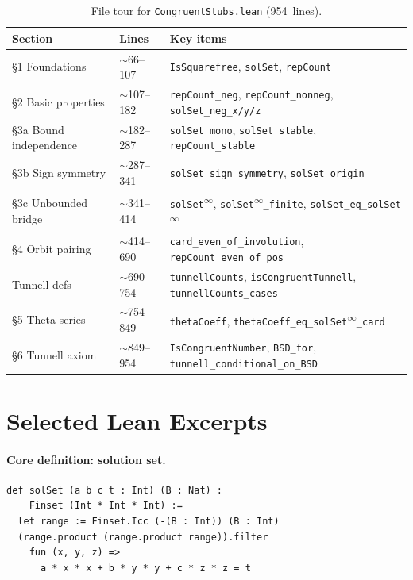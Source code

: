 \documentclass[11pt,a4paper]{article}
\theoremstyle{definition}
\newcommand{\lean}[1]{\texttt{#1}}
\begin{document}
\begin{table}[ht]
\centering
\small
\begin{tabular}{@{}llp{6cm}@{}}
\toprule
\textbf{Section} & \textbf{Lines} & \textbf{Key items} \\
\midrule
\S1 Foundations
  & $\sim$66--107
  & \lean{IsSquarefree}, \lean{solSet}, \lean{repCount} \\
\S2 Basic properties
  & $\sim$107--182
  & \lean{repCount\_neg}, \lean{repCount\_nonneg},
    \lean{solSet\_neg\_x/y/z} \\
\S3a Bound independence
  & $\sim$182--287
  & \lean{solSet\_mono}, \lean{solSet\_stable},
    \lean{repCount\_stable} \\
\S3b Sign symmetry
  & $\sim$287--341
  & \lean{solSet\_sign\_symmetry}, \lean{solSet\_origin} \\
\S3c Unbounded bridge
  & $\sim$341--414
  & \lean{solSet\textsuperscript{$\infty$}},
    \lean{solSet\textsuperscript{$\infty$}\_finite},
    \lean{solSet\_eq\_solSet\textsuperscript{$\infty$}} \\
\S4 Orbit pairing
  & $\sim$414--690
  & \lean{card\_even\_of\_involution},
    \lean{repCount\_even\_of\_pos} \\
Tunnell defs
  & $\sim$690--754
  & \lean{tunnellCounts}, \lean{isCongruentTunnell},
    \lean{tunnellCounts\_cases} \\
\S5 Theta series
  & $\sim$754--849
  & \lean{thetaCoeff},
    \lean{thetaCoeff\_eq\_solSet\textsuperscript{$\infty$}\_card} \\
\S6 Tunnell axiom
  & $\sim$849--954
  & \lean{IsCongruentNumber}, \lean{BSD\_for},
    \lean{tunnell\_conditional\_on\_BSD} \\
\bottomrule
\end{tabular}
\caption{File tour for \texttt{CongruentStubs.lean} (954~lines).}
\label{tab:tour}
\end{table}

\section{Selected Lean Excerpts}\label{app:code}

\paragraph{Core definition: solution set.}
\begin{lstlisting}
def solSet (a b c t : Int) (B : Nat) :
    Finset (Int * Int * Int) :=
  let range := Finset.Icc (-(B : Int)) (B : Int)
  (range.product (range.product range)).filter
    fun (x, y, z) =>
      a * x * x + b * y * y + c * z * z = t
\end{lstlisting}
\end{document}
